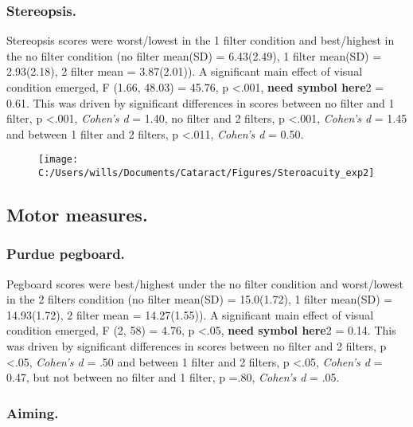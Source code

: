 \documentclass[
  english,
  man,floatsintext]{apa6}
\begin{document}
\hypertarget{stereopsis.}{%
\subsubsection{Stereopsis.}\label{stereopsis.}}

Stereopsis scores were worst/lowest in the 1 filter condition and best/highest in the no filter condition (no filter mean(SD) = 6.43(2.49), 1 filter mean(SD) = 2.93(2.18), 2 filter mean = 3.87(2.01)).
A significant main effect of visual condition emerged, F (1.66, 48.03) = 45.76, p \textless{}.001, \textbf{need symbol here}2 = 0.61.
This was driven by significant differences in scores between no filter and 1 filter, p \textless{}.001, \emph{Cohen's d} = 1.40, no filter and 2 filters, p \textless{}.001, \emph{Cohen's d} = 1.45 and between 1 filter and 2 filters, p \textless{}.011, \emph{Cohen's d} = 0.50.

\begin{figure}

{\centering \texttt{[image: C:/Users/wills/Documents/Cataract/Figures/Steroacuity\_exp2]} 

}

\caption{ }\label{fig:unnamed-chunk-6}
\end{figure}

\hypertarget{motor-measures.}{%
\subsection{Motor measures.}\label{motor-measures.}}

\hypertarget{purdue-pegboard.}{%
\subsubsection{Purdue pegboard.}\label{purdue-pegboard.}}

Pegboard scores were best/highest under the no filter condition and worst/lowest in the 2 filters condition (no filter mean(SD) = 15.0(1.72), 1 filter mean(SD) = 14.93(1.72), 2 filter mean = 14.27(1.55)).
A significant main effect of visual condition emerged, F (2, 58) = 4.76, p \textless{}.05, \textbf{need symbol here}2 = 0.14.
This was driven by significant differences in scores between no filter and 2 filters, p \textless{}.05, \emph{Cohen's d} = .50 and between 1 filter and 2 filters, p \textless{}.05, \emph{Cohen's d} = 0.47, but not between no filter and 1 filter, p =.80, \emph{Cohen's d} = .05.

\hypertarget{aiming.-1}{%
\subsubsection{Aiming.}\label{aiming.-1}}
\end{document}
